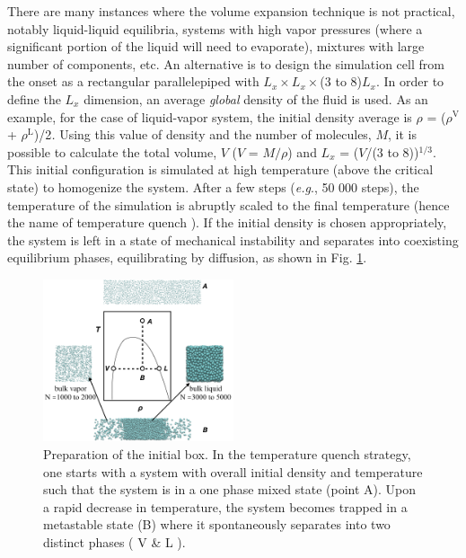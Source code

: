 \documentclass[9pt,bestpractices]{livecoms}
\begin{document}
There are many instances where the volume expansion technique is not practical,
notably liquid-liquid equilibria, systems with high vapor pressures (where
a significant portion of the liquid will need to evaporate), mixtures with
large number of components, etc.  An alternative is to design the simulation
cell from the onset as a rectangular parallelepiped with $L_{x} \times L_{x} \times$(3 to 8)$L_{x}$. In order to define the
$L_{x}$ dimension, an average \textit{global} density of the fluid is
used. As an example, for the case of liquid-vapor system, the initial density
average is ${\rho}$ = (${\rho}^{\mathrm{V}}$
+ ${\rho}^{\mathrm{L}}$)/2\textit{.} Using this value of density and the
number of molecules, $M$, it is possible to calculate the total volume,
$V$ ($V$ = $M/\rho$) and $L_{x}$
= ($V$/(3 to 8))$^{\mathrm{1/3}}$. This initial configuration is
simulated at high temperature (above the critical state) to homogenize the
system. After a few steps (\textit{e.g}., 50 000 steps), the temperature of the
simulation is abruptly scaled to the final temperature (hence the name of
temperature quench \citep{martinez2005}).  If the initial
density is chosen appropriately, the system is left in a state of mechanical
instability and separates into coexisting equilibrium phases, equilibrating by
diffusion, as shown in Fig. \ref{fig:6b}.

\begin{figure}
  \includegraphics[width=0.5\textwidth]{gfx/image19.png}
  \caption{Preparation of the initial box. In the temperature quench strategy, one starts with a system with overall initial density and temperature such that the system is in a one phase mixed state (point A). Upon a rapid decrease in temperature, the system becomes trapped in a metastable state (B) where it spontaneously separates into two distinct phases ( V \& L ). }
  \label{fig:6b}
\end{figure}
\end{document}
